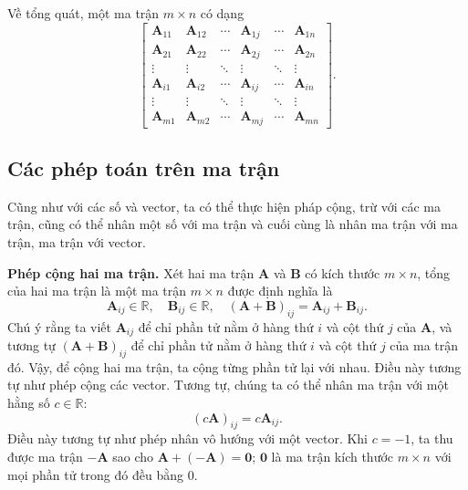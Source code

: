 Về tổng quát, một ma trận \(m\times n\) có dạng
\[\begin{bmatrix}
    \mathbf{A}_{11} &   \mathbf{A}_{12} &\cdots &\mathbf{A}_{1j} &\cdots      & \mathbf{A}_{1n}\\  
    \mathbf{A}_{21} &   \mathbf{A}_{22} &\cdots &\mathbf{A}_{2j} &\cdots      & \mathbf{A}_{2n}\\
    \vdots          &   \vdots          &\ddots &\vdots          &\ddots      & \vdots         \\
    \mathbf{A}_{i1} &   \mathbf{A}_{i2} &\cdots &\mathbf{A}_{ij} &\cdots      & \mathbf{A}_{in}\\
    \vdots          &   \vdots          &\ddots &\vdots          &\ddots      &\vdots          \\
    \mathbf{A}_{m1} &   \mathbf{A}_{m2} &\cdots &\mathbf{A}_{mj} &\cdots      & \mathbf{A}_{mn}              
\end{bmatrix}.\]
\subsection{Các phép toán trên ma trận}
Cũng như với các số và vector, ta có thể thực hiện pháp cộng, trừ với các ma trận, cũng có thể nhân một số với ma trận và cuối cùng là nhân ma trận với ma trận, ma trận với vector. 
\vspace{8pt}

\textbf{Phép cộng hai ma trận.} Xét hai ma trận \(\mathbf{A}\) và \(\mathbf{B}\) có kích thước \(m\times n\), tổng của hai ma trận là một ma trận \(m\times n\) được định nghĩa là 
\begin{equation}
   \mathbf{A}_{ij}\in\mathbb{R},\quad \mathbf{B}_{ij}\in\mathbb{R},\quad 
    (\mathbf{A}+\mathbf{B})_{ij}=\mathbf{A}_{ij}+\mathbf{B}_{ij}.
\end{equation}
Chú ý rằng ta viết \(\mathbf{A}_{ij}\) để chỉ phần tử nằm ở hàng thứ \(i\) và cột thứ \(j\) của \(\mathbf{A}\), và tương tự \((\mathbf{A+B})_{ij}\) để chỉ phần tử nằm ở hàng thứ \(i\) và cột thứ \(j\) của ma trận đó. Vậy, để cộng hai ma trận, ta cộng từng phần tử lại với nhau. Điều này tương tự như phép cộng các vector.
Tương tự, chúng ta có thể nhân ma trận với một hằng số \(c\in\mathbb{R}\):
\begin{equation}
    (c\mathbf{A})_{ij}=c\mathbf{A}_{ij}.
\end{equation}
Điều này tương tự như phép nhân vô hướng với một vector. Khi \(c=-1\), ta thu được ma trận \(-\mathbf{A}\) sao cho \(\mathbf{A}+(-\mathbf{A})=\mathbf{0}\); \(\mathbf{0}\) là ma trận kích thước \(m\times n\) với mọi phần tử trong đó đều bằng \(0\).

